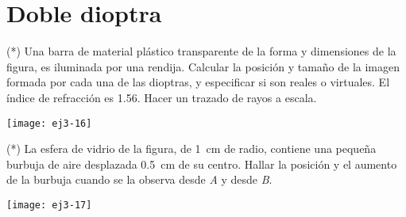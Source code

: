\section*{Doble dioptra}

\item 
\begin{minipage}[t][3cm]{0.55\textwidth}
(*) Una barra de material plástico transparente de la forma y dimensiones de la figura, es iluminada por una rendija.
Calcular la posición y tamaño de la imagen formada por cada una de las dioptras, y especificar si son reales o virtuales.
El índice de refracción es \num{1.56}.
Hacer un trazado de rayos a escala.
\end{minipage}
\begin{minipage}[c][0.4cm][t]{0.4\textwidth}
	\texttt{[image: ej3-16]}
\end{minipage}



\item
\begin{minipage}[t][1.5cm]{0.55\textwidth}
(*) La esfera de vidrio de la figura, de \SI{1}{\centi\metre} de radio, contiene una pequeña burbuja de aire desplazada \SI{0.5}{\centi\metre} de su centro.
Hallar la posición y el aumento de la burbuja cuando se la observa desde \emph{A} y desde \emph{B}.
\end{minipage}
\begin{minipage}[c][0.8cm][t]{0.4\textwidth}
	\texttt{[image: ej3-17]}
\end{minipage}
